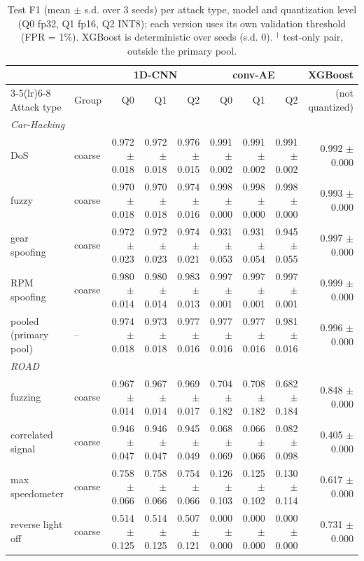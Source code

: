\begin{table}[t]
\centering
\footnotesize
\setlength{\tabcolsep}{3pt}
\caption{Test F1 (mean $\pm$ s.d. over 3 seeds) per attack type, model and quantization level (Q0 fp32, Q1 fp16, Q2 INT8); each version uses its own validation threshold (FPR = 1\%). XGBoost is deterministic over seeds (s.d. 0). $^\dagger$ test-only pair, outside the primary pool.}
\label{tab:f1}
\begin{tabular}{@{}llrrrrrrr@{}}
\toprule
& & \multicolumn{3}{c}{1D-CNN} & \multicolumn{3}{c}{conv-AE} & XGBoost \\
\cmidrule(lr){3-5}\cmidrule(lr){6-8}
Attack type & Group & Q0 & Q1 & Q2 & Q0 & Q1 & Q2 & (not quantized) \\
\midrule
\multicolumn{9}{l}{\textit{Car-Hacking}} \\
DoS & coarse & 0.972 $\pm$ 0.018 & 0.972 $\pm$ 0.018 & 0.976 $\pm$ 0.015 & 0.991 $\pm$ 0.002 & 0.991 $\pm$ 0.002 & 0.991 $\pm$ 0.002 & 0.992 $\pm$ 0.000 \\
fuzzy & coarse & 0.970 $\pm$ 0.018 & 0.970 $\pm$ 0.018 & 0.974 $\pm$ 0.016 & 0.998 $\pm$ 0.000 & 0.998 $\pm$ 0.000 & 0.998 $\pm$ 0.000 & 0.993 $\pm$ 0.000 \\
gear spoofing & coarse & 0.972 $\pm$ 0.023 & 0.972 $\pm$ 0.023 & 0.974 $\pm$ 0.021 & 0.931 $\pm$ 0.053 & 0.931 $\pm$ 0.054 & 0.945 $\pm$ 0.055 & 0.997 $\pm$ 0.000 \\
RPM spoofing & coarse & 0.980 $\pm$ 0.014 & 0.980 $\pm$ 0.014 & 0.983 $\pm$ 0.013 & 0.997 $\pm$ 0.001 & 0.997 $\pm$ 0.001 & 0.997 $\pm$ 0.001 & 0.999 $\pm$ 0.000 \\
pooled (primary pool) & -- & 0.974 $\pm$ 0.018 & 0.973 $\pm$ 0.018 & 0.977 $\pm$ 0.016 & 0.977 $\pm$ 0.016 & 0.977 $\pm$ 0.016 & 0.981 $\pm$ 0.016 & 0.996 $\pm$ 0.000 \\
\midrule
\multicolumn{9}{l}{\textit{ROAD}} \\
fuzzing & coarse & 0.967 $\pm$ 0.014 & 0.967 $\pm$ 0.014 & 0.969 $\pm$ 0.017 & 0.704 $\pm$ 0.182 & 0.708 $\pm$ 0.182 & 0.682 $\pm$ 0.184 & 0.848 $\pm$ 0.000 \\
correlated signal & coarse & 0.946 $\pm$ 0.047 & 0.946 $\pm$ 0.047 & 0.945 $\pm$ 0.049 & 0.068 $\pm$ 0.069 & 0.066 $\pm$ 0.066 & 0.082 $\pm$ 0.098 & 0.405 $\pm$ 0.000 \\
max speedometer & coarse & 0.758 $\pm$ 0.066 & 0.758 $\pm$ 0.066 & 0.754 $\pm$ 0.066 & 0.126 $\pm$ 0.103 & 0.125 $\pm$ 0.102 & 0.130 $\pm$ 0.114 & 0.617 $\pm$ 0.000 \\
reverse light off & coarse & 0.514 $\pm$ 0.125 & 0.514 $\pm$ 0.125 & 0.507 $\pm$ 0.121 & 0.000 $\pm$ 0.000 & 0.000 $\pm$ 0.000 & 0.000 $\pm$ 0.000 & 0.731 $\pm$ 0.000 \\

\end{tabular}
\end{table}
